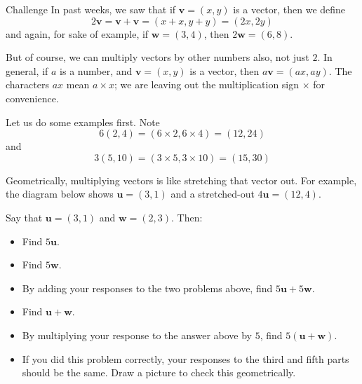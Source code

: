 \documentclass[14pt,letterpaper]{article}
\begin{document}
\begin{problem}{Challenge}
  In past weeks, we saw that if \(\mathbf{v} = (x, y)\) is a vector, then we
  define \[
    2\mathbf{v} = \mathbf{v} + \mathbf{v} = (x + x, y + y) = (2x, 2y)
  \] and again, for sake of example, if \(\mathbf{w} = (3, 4)\), then
  \(2\mathbf{w} = (6, 8)\).

  But of course, we can multiply vectors by other numbers also, not just \(2\).
  In general, if \(a\) is a number, and \(\mathbf{v} = (x, y)\) is a vector,
  then \(a\mathbf{v} = (ax, ay)\). The characters \(ax\) mean \(a \times x\);
  we are leaving out the multiplication sign \(\times\) for convenience.

  Let us do some examples first. Note \[
    6(2, 4) = (6\times2, 6\times4) = (12, 24)
  \] and \[
    3(5, 10) = (3\times5, 3\times10) = (15, 30)
  \]

  Geometrically, multiplying vectors is like stretching that vector out. For
  example, the diagram below shows \(\mathbf{u} = (3, 1)\) and a stretched-out
  \(4\mathbf{u} = (12, 4)\).

  \begin{center}
  \end{center}

  Say that \(\mathbf{u} = (3, 1)\) and \(\mathbf{w} = (2, 3)\). Then:

  \begin{itemize}
    \item Find \(5\mathbf{u}\).
    \item Find \(5\mathbf{w}\).
    \item By adding your responses to the two problems above, find
    \(5\mathbf{u} + 5\mathbf{w}\).
    \item Find \(\mathbf{u} + \mathbf{w}\).
    \item By multiplying your response to the answer above by \(5\), find
    \(5(\mathbf{u} + \mathbf{w})\).
    \item If you did this problem correctly, your responses to the third and
    fifth parts should be the same. Draw a picture to check this geometrically.
  \end{itemize}
\end{problem}
\end{document}
